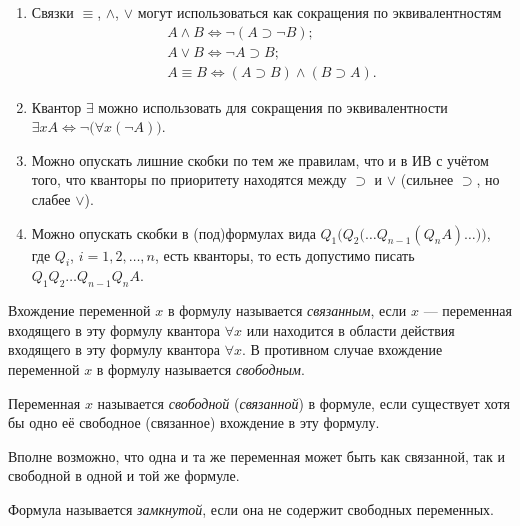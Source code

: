 \begin{remark*}\leavevmode
    \begin{enumerate}
        \item Связки $\equiv$, $\land$, $\lor$ могут использоваться как сокращения по эквивалентностям
        \begin{gather*}
            A \land B \Longleftrightarrow \neg(A \supset \neg B); \\
            A \lor B \Longleftrightarrow \neg A \supset B; \\
            A \equiv B \Longleftrightarrow (A \supset B)\land(B \supset A).
        \end{gather*}

        \item Квантор $\exists$ можно использовать для сокращения по эквивалентности $\exists xA \Longleftrightarrow \neg\big(\forall x(\neg A)\big)$.

        \item Можно опускать лишние скобки по тем же правилам, что и в ИВ с учётом того, что кванторы по приоритету находятся между $\supset$ и $\lor$ (сильнее $\supset$, но слабее $\lor$).

        \item Можно опускать скобки в (под)формулах вида $Q_1\Big(Q_2\big(\dots Q_{n - 1}(Q_nA)\dots\big)\Big)$, где $Q_i$, $i = 1, 2, \dots, n$, есть кванторы, то есть допустимо писать $Q_1Q_2\dots Q_{n - 1}Q_nA$.
    \end{enumerate}
\end{remark*}

\begin{definition*}
    Вхождение переменной $x$ в формулу называется \textit{связанным}, если $x$ --- переменная входящего в эту формулу квантора $\forall x$ или находится в области действия входящего в эту формулу квантора $\forall x$. В противном случае вхождение переменной $x$ в формулу называется \textit{свободным}.
\end{definition*}

\begin{definition*}
    Переменная $x$ называется \textit{свободной} (\textit{связанной}) в формуле, если существует хотя бы одно её свободное (связанное) вхождение в эту формулу.
\end{definition*}
Вполне возможно, что одна и та же переменная может быть как связанной, так и свободной в одной и той же формуле.

\begin{definition*}
    Формула называется \textit{замкнутой}, если она не содержит свободных переменных.
\end{definition*}